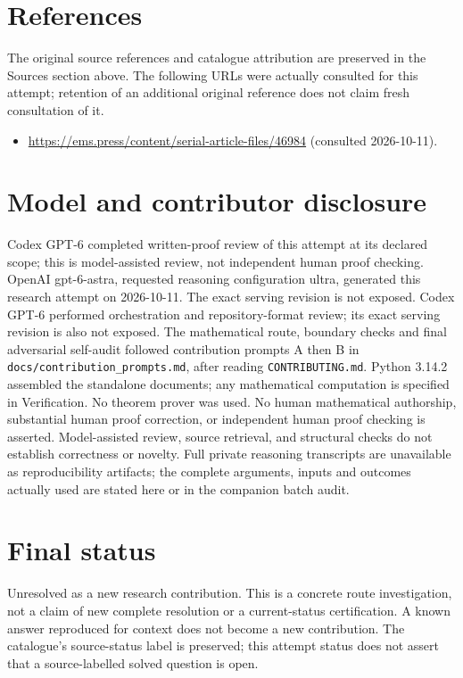 \documentclass[11pt]{article}
\begin{document}
\section{References}
The original source references and catalogue attribution are preserved in the
Sources section above. The following URLs were actually consulted for this attempt;
retention of an additional original reference does not claim fresh consultation of it.
\begin{itemize}
\item \url{https://ems.press/content/serial-article-files/46984} (consulted 2026-10-11). 
\end{itemize}
\section{Model and contributor disclosure}
Codex GPT-6 completed written-proof review of this attempt at its declared scope; this is model-assisted review, not independent human proof checking.
OpenAI gpt-6-astra, requested reasoning configuration ultra, generated this research
attempt on 2026-10-11. The exact serving revision is not exposed. Codex GPT-6
performed orchestration and repository-format review; its exact serving revision
is also not exposed. The mathematical route, boundary checks and final adversarial
self-audit followed contribution prompts A then B in
\texttt{docs/contribution\_prompts.md}, after reading \texttt{CONTRIBUTING.md}.
Python 3.14.2 assembled the standalone documents; any mathematical computation is
specified in Verification. No theorem prover was used. No human mathematical
authorship, substantial human proof correction, or independent human proof checking
is asserted. Model-assisted review, source retrieval, and structural checks do not
establish correctness or novelty. Full private reasoning transcripts are unavailable
as reproducibility artifacts; the complete arguments, inputs and outcomes actually
used are stated here or in the companion batch audit.
\section{Final status}
Unresolved as a new research contribution. This is a concrete route investigation,
not a claim of new complete resolution or a current-status certification. A known
answer reproduced for context does not become a new contribution. The catalogue's
source-status label is preserved; this attempt status does not assert that a
source-labelled solved question is open.
\end{document}

